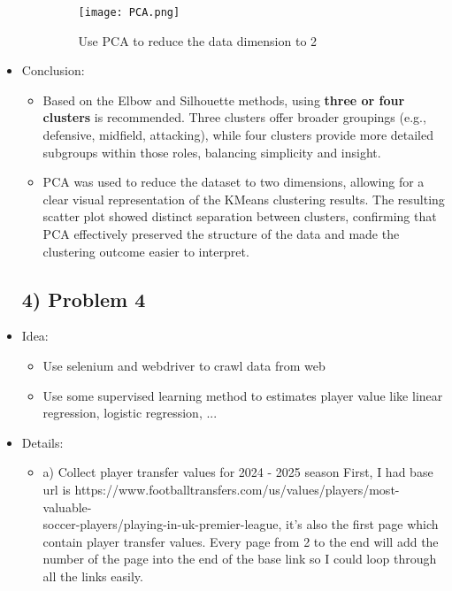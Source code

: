 \documentclass[a4paper,12pt]{article}
\begin{document}
\begin{itemize}[label= {*}, leftmargin= 1cm]
\begin{itemize}[label= {}, leftmargin= 1cm]
        \begin{figure}[h]
            \centering
            \texttt{[image: PCA.png]}
            \caption{Use PCA to reduce the data dimension to 2}
        \end{figure}
        
        \vspace{0.3cm}
        
    \end{itemize}
    \item {\Large Conclusion:}
    \begin{itemize}[label= {-}, leftmargin= 1cm]
        \item Based on the Elbow and Silhouette methods, using \textbf{three or four clusters }is recommended. Three clusters offer broader groupings (e.g., defensive, midfield, attacking), while four clusters provide more detailed subgroups within those roles, balancing simplicity and insight.
        \item PCA was used to reduce the dataset to two dimensions, allowing for a clear visual representation of the KMeans clustering results. The resulting scatter plot showed distinct separation between clusters, confirming that PCA effectively preserved the structure of the data and made the clustering outcome easier to interpret.
    \end{itemize}
    \newpage

    \subsection*{4) Problem 4}
    \item {\Large Idea:}
    \begin{itemize}[label= {-}, leftmargin= 1cm]
        \item Use selenium and webdriver to crawl data from web
        \item Use some supervised learning method to estimates player value like linear regression, logistic regression, ...
    \end{itemize}
    \item {\Large Details:}
    \begin{itemize}[label= {}, leftmargin= 1cm]
        \item a) Collect player transfer values for 2024 - 2025 season
        First, I had base url is https://www.footballtransfers.com/us/values/players/most-valuable-\\
        soccer-players/playing-in-uk-premier-league, it's also the first page which contain player transfer values. Every page from 2 to the end will add the number of the page into the end of the base link so I could loop through all the links easily. 
        \vspace{0.3cm}


\end{itemize}
\end{itemize}
\end{document}
